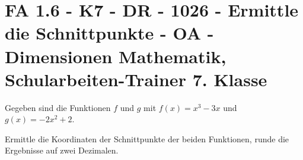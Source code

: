 \section{FA 1.6 - K7 - DR - 1026 - Ermittle die Schnittpunkte - OA - Dimensionen Mathematik, Schularbeiten-Trainer 7. Klasse}

\begin{beispiel}[K7 - DR]{1} %
Gegeben sind die Funktionen $f$ und $g$ mit $f(x)=x^3-3x$ und $g(x)=-2x^2+2$.

Ermittle die Koordinaten der Schnittpunkte der beiden Funktionen, runde die Ergebnisse auf zwei Dezimalen.\leer

				
				\end{beispiel}